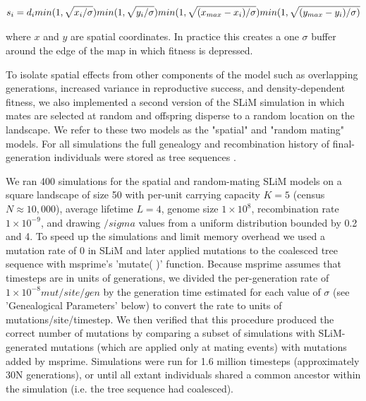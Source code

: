 \documentclass[11pt,twoside,lineno]{preprint}
\newif\ifcomments
\newcommand{\ak}[1]{\ifcomments{{\color{red} \it (#1)}}\else{}\fi}
\begin{document}
\begin{equation}
    s_{i}=d_{i} min(1,\sqrt{x_{i}/\sigma})
    min(1,\sqrt{y_{i}/\sigma})\\
    min(1,\sqrt{(x_{max}-x_{i})/\sigma})
    min(1,\sqrt{(y_{max}-y_{i})/\sigma)}
\end{equation}

where $x$ and $y$ are spatial coordinates. In practice this creates a one $\sigma$ buffer around the edge of the map in which fitness is depressed.

To isolate spatial effects from other components of the model such as overlapping generations, increased variance in reproductive success, and density-dependent fitness, we  also implemented a second version of the SLiM simulation in which mates are selected at random and offspring disperse to a random location on the landscape. We refer to these two models as the "spatial" and "random mating" models. For all simulations the full genealogy and recombination history of final-generation individuals were stored as tree sequences \citep{Kelleher2018}. \ak{add a link to the github repo with code}

We ran 400 simulations for the spatial and random-mating SLiM models on a square landscape of size 50 with per-unit carrying capacity $K=5$ (census $N \approx 10,000$), average lifetime $L=4$, genome size $1\times10^{8}$, recombination rate $1\times10^{-9}$, and drawing $/sigma$ values from a uniform distribution bounded by 0.2 and 4. To speed up the simulations and limit memory overhead we used a mutation rate of 0 in SLiM and later applied mutations to the coalesced tree sequence with msprime's 'mutate( )' function. Because msprime assumes that timesteps are in units of generations, we divided the per-generation rate of $1\times10^{-8} mut/site/gen$ by the generation time estimated for each value of $\sigma$ (see 'Genealogical Parameters' below) to convert the rate to units of mutations/site/timestep. We then verified that this procedure produced the correct number of mutations by comparing a subset of simulations with SLiM-generated mutations (which are applied only at mating events) with mutations added by msprime. Simulations were run for 1.6 million timesteps (approximately 30N generations), or until all extant individuals shared a common ancestor within the simulation (i.e. the tree sequence had coalesced). \ak{maybe worth including a table with some basic runtime results in the supplement?}
\end{document}
